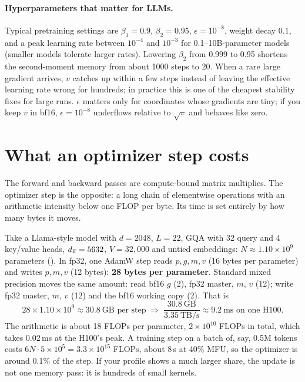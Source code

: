 \paragraph{Hyperparameters that matter for LLMs.} Typical pretraining settings are
$\beta_1=0.9$, $\beta_2=0.95$, $\epsilon=10^{-8}$, weight decay $0.1$, and a peak learning rate
between $10^{-4}$ and $10^{-3}$ for 0.1--10B-parameter models (smaller models tolerate larger
rates). Lowering $\beta_2$ from 0.999 to 0.95 shortens the second-moment memory from about 1000
steps to 20. When a rare large gradient arrives, $v$ catches up within a few steps instead of
leaving the effective learning rate wrong for hundreds; in practice this is one of the cheapest
stability fixes for large runs. $\epsilon$ matters only for coordinates whose gradients are
tiny; if you keep $v$ in bf16, $\epsilon=10^{-8}$ underflows relative to $\sqrt{v}$ and
behaves like zero.

\section{What an optimizer step costs}\label{sec:optim:cost}

The forward and backward passes are compute-bound matrix multiplies. The optimizer step is the
opposite: a long chain of elementwise operations with an arithmetic intensity below one FLOP per
byte. Its time is set entirely by how many bytes it moves.

\begin{napkinmath}
Take a Llama-style model with $d=2048$, $L=22$, GQA with 32 query and 4 key/value heads,
$d_{\text{ff}}=5632$, $V=32{,}000$ and untied embeddings: $N\approx1.10\times10^9$ parameters
(). In fp32, one AdamW step reads $p, g, m, v$ (16 bytes per
parameter) and writes $p, m, v$ (12 bytes): \textbf{28 bytes per parameter}. Standard mixed
precision moves the same amount: read bf16 $g$ (2), fp32 master, $m$, $v$ (12); write fp32 master,
$m$, $v$ (12) and the bf16 working copy (2). That is
\[
28 \times 1.10\times10^{9} \approx 30.8\ \text{GB per step}
\;\Rightarrow\; \frac{30.8\ \text{GB}}{3.35\ \text{TB/s}} \approx 9.2\ \text{ms on one H100}.
\]
The arithmetic is about 18 FLOPs per parameter, $2\times10^{10}$ FLOPs in total, which takes 0.02\,ms
at the H100's peak. A training step on a batch of, say, 0.5M tokens costs
$6N\cdot 5\times10^5 = 3.3\times10^{15}$ FLOPs, about 8\,s at 40\% MFU, so the optimizer is
around 0.1\% of the step. If your profile shows a much larger share, the update is not one
memory pass: it is hundreds of small kernels.
\end{napkinmath}

